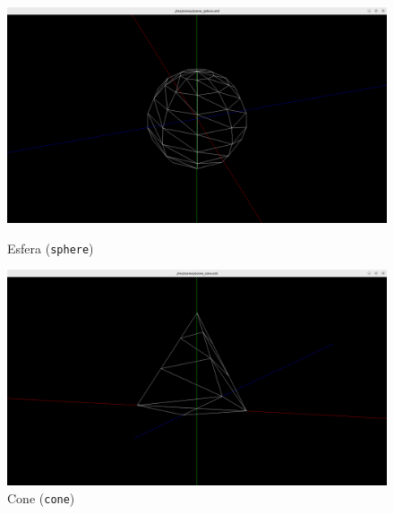 \documentclass[12pt, a4paper]{article}
\begin{document}
\begin{figure}[H]
    \centering
    \begin{minipage}{0.48\textwidth}
        \centering
        \includegraphics[width=\textwidth]{res/phase1/results/Sphere.png}
        \caption{Esfera (\texttt{sphere})}
    \end{minipage}\hfill
    \begin{minipage}{0.48\textwidth}
        \centering
        \includegraphics[width=\textwidth]{res/phase1/results/Cone.png}
        \caption{Cone (\texttt{cone})}
    \end{minipage}\hfill
\end{figure}
\end{document}
